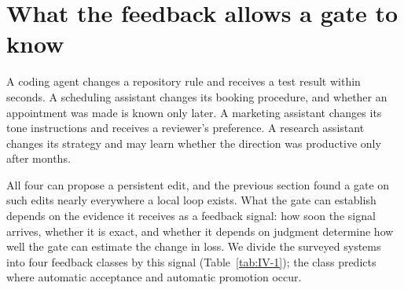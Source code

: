 \section{What the feedback allows a gate to know}\label{sec:signal}

A coding agent changes a repository rule and receives a test result within seconds. A scheduling assistant changes its booking procedure, and whether an appointment was made is known only later. A marketing assistant changes its tone instructions and receives a reviewer's preference. A research assistant changes its strategy and may learn whether the direction was productive only after months.

All four can propose a persistent edit, and the previous section found a gate on such edits nearly everywhere a local loop exists. What the gate can establish depends on the evidence it receives as a feedback signal: how soon the signal arrives, whether it is exact, and whether it depends on judgment determine how well the gate can estimate the change in loss. We divide the surveyed systems into four feedback classes by this signal (Table~\ref{tab:IV-1}); the class predicts where automatic acceptance and automatic promotion occur.

